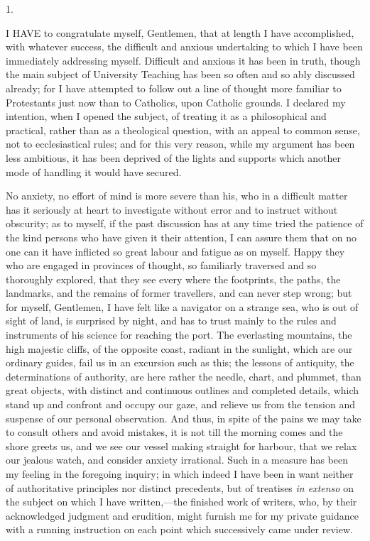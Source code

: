 
1.

I HAVE to congratulate myself, Gentlemen, that at length I
have accomplished, with whatever success, the difficult and anxious
undertaking to which I have been immediately addressing myself.
Difficult and anxious it has been in truth, though the main subject of
University Teaching has been so often and so ably discussed already;
for I have attempted to follow out a line of thought more familiar to
Protestants just now than to Catholics, upon Catholic grounds. I
declared my intention, when I opened the subject, of treating it as a
philosophical and practical, rather than as a theological question,
with an appeal to common sense, not to ecclesiastical rules; and for
this very reason, while my argument has been less ambitious, it has
been deprived of the lights and supports which another mode of
handling it would have secured.

No anxiety, no effort of mind is more severe than his, who in a
difficult matter has it seriously at heart to investigate without
error and to instruct without obscurity; as to myself, if the past
discussion has at any time tried the patience of the kind persons who
have given it their attention, I can assure them that on no one can it
have inflicted so great labour and fatigue as on myself. Happy
they who are engaged in provinces of thought, so familiarly traversed
and so thoroughly explored, that they see every where the footprints,
the paths, the landmarks, and the remains of former travellers, and
can never step wrong; but for myself, Gentlemen, I have felt like a
navigator on a strange sea, who is out of sight of land, is surprised
by night, and has to trust mainly to the rules and instruments of his
science for reaching the port. The everlasting mountains, the high
majestic cliffs, of the opposite coast, radiant in the sunlight, which
are our ordinary guides, fail us in an excursion such as this; the
lessons of antiquity, the determinations of authority, are here rather
the needle, chart, and plummet, than great objects, with distinct and
continuous outlines and completed details, which stand up and confront
and occupy our gaze, and relieve us from the tension and suspense of
our personal observation. And thus, in spite of the pains we may take
to consult others and avoid mistakes, it is not till the morning comes
and the shore greets us, and we see our vessel making straight for
harbour, that we relax our jealous watch, and consider anxiety
irrational. Such in a measure has been my feeling in the foregoing
inquiry; in which indeed I have been in want neither of authoritative
principles nor distinct precedents, but of treatises \emph{in extenso}
on the subject on which I have written,—the finished work of
writers, who, by their acknowledged judgment and erudition, might
furnish me for my private guidance with a running instruction on each
point which successively came under review.


